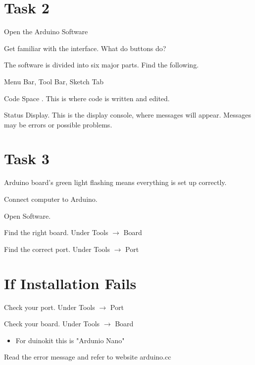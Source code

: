 \documentclass[12pt]{article}
\begin{document}
\section*{Task 2} 
\begin{todolist}
    \item Open the Arduino Software
    \item Get familiar with the interface. What do buttons do? 
\end{todolist}
The software is divided into six major parts. Find the following. 
\begin{todolist}
    \item Menu Bar, Tool Bar, Sketch Tab
    \item Code Space . This is where code is written and edited. 
    \item Status Display. This is the display console, where messages will appear. Messages may be errors or possible problems. 
\end{todolist}
\section*{Task 3}
Arduino board's green light flashing means everything is set up correctly. 
\begin{todolist}
    \item Connect computer to Arduino. 
    \item Open Software. 
    \item Find the right board. Under Tools $\rightarrow$ Board
    \item Find the correct port. Under Tools $\rightarrow$ Port
\end{todolist}
\section*{If Installation Fails}
\begin{todolist}
    \item Check your port. Under Tools $\rightarrow$ Port 
    \item Check your board. Under Tools $\rightarrow$ Board
    \begin{itemize}
        \item For duinokit this is "Ardunio Nano" 
    \end{itemize}
    \item Read the error message and refer to website arduino.cc
\end{todolist}
\end{document}
